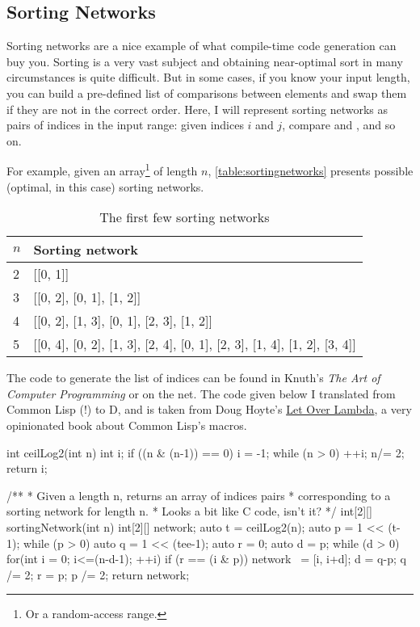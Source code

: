\subsection{Sorting Networks}\label{sortingnetworks}

Sorting networks are a nice example of what compile-time code generation can buy you. Sorting is a very vast subject and obtaining near-optimal sort in many circumstances is quite difficult. But in some cases, if you know your input length, you can build a pre-defined list of comparisons between elements and swap them if they are not in the correct order. Here, I will represent sorting networks as pairs of indices in the input range: given indices $i$ and $j$, compare  and , and so on.

For example, given an array\footnote{ Or a random-access range.} of length $n$, \autoref{table:sortingnetworks} presents possible (optimal, in this case) sorting networks.

\begin{table}[htb]
\centering
\begin{tabular}[c]{|l|l|}
\hline
$n$ & Sorting network \\ \hline \hline
2   & [[0, 1]] \\ \hline
3   & [[0, 2], [0, 1], [1, 2]] \\ \hline
4   & [[0, 2], [1, 3], [0, 1], [2, 3], [1, 2]] \\ \hline
5   & [[0, 4], [0, 2], [1, 3], [2, 4], [0, 1], [2, 3], [1, 4], [1, 2], [3, 4]] \\ \hline
\end{tabular}
\caption{The first few sorting networks}
\label{table:sortingnetworks}
\end{table}

The code to generate the list of indices can be found in Knuth's \emph{The Art of Computer Programming} or on the net. The code given below I translated from Common Lisp (!) to D, and is taken from Doug Hoyte's \href{http://letoverlambda.com}{Let Over Lambda}, a very opinionated book about Common Lisp's macros.

\begin{dcode}
int ceilLog2(int n)
{
    int i;
    if ((n & (n-1)) == 0) i = -1;
    while (n > 0) { ++i; n/= 2;}
    return i;
}

/**
 * Given a length n, returns an array of indices pairs
 * corresponding to a sorting network for length n.
 * Looks a bit like C code, isn't it?
 */
int[2][] sortingNetwork(int n)
{
    int[2][] network;
    auto t = ceilLog2(n);
    auto p = 1 << (t-1);
    while (p > 0)
    {
        auto q = 1 << (tee-1);
        auto r = 0;
        auto d = p;
        while (d > 0)
        {
            for(int i = 0; i<=(n-d-1); ++i)
            {
                if (r == (i & p)) network ~= [i, i+d];
            }
            d = q-p;
            q /= 2;
            r = p;
        }
        p /= 2;
    }
    return network;
}
\end{dcode}

